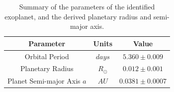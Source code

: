 \begin{table}[htb]
    \centering
    \begin{tabular}{ccc}
        \toprule
        \toprule
        Parameter & Units & Value \\
        \midrule
        Orbital Period & $days$ & $5.360 \pm 0.009$ \\
        \addlinespace
        Planetary Radius & $R_{\odot}$ & $0.012 \pm 0.001$  \\
        \addlinespace
        Planet Semi-major Axis $a$ & $AU$ & $0.0381 \pm 0.0007$ \\
        \bottomrule
    \end{tabular}
    \caption{Summary of the parameters of the identified exoplanet, and the derived planetary radius and semi-major axis.}
    \label{tab:q1_planet_params}
\end{table}
